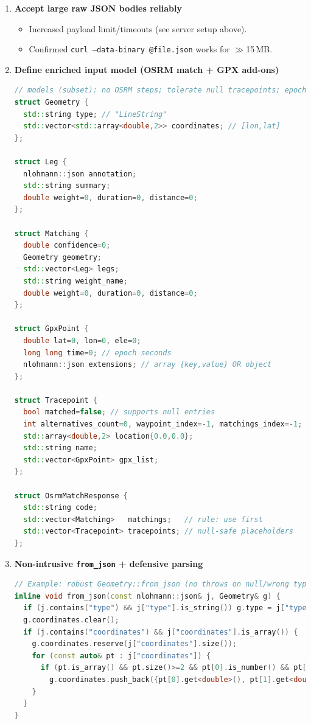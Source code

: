 \documentclass[11pt,twoside]{report}
\begin{document}
\begin{enumerate}
	\item \textbf{Accept large raw JSON bodies reliably}
	      \begin{itemize}
		      \item Increased payload limit/timeouts (see server setup above).
		      \item Confirmed \texttt{curl --data-binary @file.json} works for $\gg$15\,MB.
	      \end{itemize}

	\item \textbf{Define enriched input model (OSRM match + GPX add-ons)}
	      \begin{lstlisting}[language=C++]
// models (subset): no OSRM steps; tolerate null tracepoints; epoch times in GPX.
struct Geometry {
  std::string type; // "LineString"
  std::vector<std::array<double,2>> coordinates; // [lon,lat]
};

struct Leg {
  nlohmann::json annotation;
  std::string summary;
  double weight=0, duration=0, distance=0;
};

struct Matching {
  double confidence=0;
  Geometry geometry;
  std::vector<Leg> legs;
  std::string weight_name;
  double weight=0, duration=0, distance=0;
};

struct GpxPoint {
  double lat=0, lon=0, ele=0;
  long long time=0; // epoch seconds
  nlohmann::json extensions; // array {key,value} OR object
};

struct Tracepoint {
  bool matched=false; // supports null entries
  int alternatives_count=0, waypoint_index=-1, matchings_index=-1;
  std::array<double,2> location{0.0,0.0};
  std::string name;
  std::vector<GpxPoint> gpx_list;
};

struct OsrmMatchResponse {
  std::string code;
  std::vector<Matching>   matchings;   // rule: use first
  std::vector<Tracepoint> tracepoints; // null-safe placeholders
};
    \end{lstlisting}

	\item \textbf{Non-intrusive \texttt{from\_json} + defensive parsing}
	      \begin{lstlisting}[language=C++]
// Example: robust Geometry::from_json (no throws on null/wrong types)
inline void from_json(const nlohmann::json& j, Geometry& g) {
  if (j.contains("type") && j["type"].is_string()) g.type = j["type"].get<std::string>();
  g.coordinates.clear();
  if (j.contains("coordinates") && j["coordinates"].is_array()) {
    g.coordinates.reserve(j["coordinates"].size());
    for (const auto& pt : j["coordinates"]) {
      if (pt.is_array() && pt.size()>=2 && pt[0].is_number() && pt[1].is_number())
        g.coordinates.push_back({pt[0].get<double>(), pt[1].get<double>()});
    }
  }
}


\end{lstlisting}
\end{enumerate}
\end{document}

